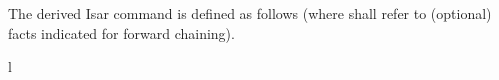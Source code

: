 \begin{isabellebody}
\begin{isamarkuptext}
  The derived Isar command \mbox{} is defined as follows
  (where  shall refer to (optional)
  facts indicated for forward chaining).
  \begin{matharray}{l}
    ~~\mbox{}~ \\[1ex]
    \quad \mbox{}~ \\
    \quad \mbox{}~ \\
    \qquad \mbox{}~ \\
    \qquad \mbox{}~ \\
    \qquad \mbox{}~\mbox{}~ \\
    \quad\qquad \mbox{}~\isa{{\isacharminus}} \\
    \quad\qquad \mbox{}~ \\
    \quad \mbox{} \\
    \quad \mbox{}~~\mbox{} \\
  \end{matharray}


\end{isamarkuptext}
\end{isabellebody}
